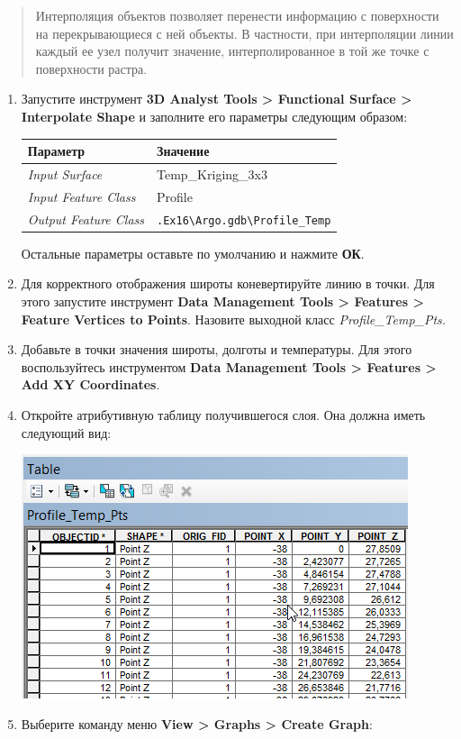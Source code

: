 \documentclass[]{book}
\theoremstyle{definition}
\theoremstyle{definition}
\theoremstyle{definition}
\theoremstyle{remark}
\begin{document}
\begin{quote}
Интерполяция объектов позволяет перенести информацию с поверхности на
перекрывающиеся с ней объекты. В частности, при интерполяции линии
каждый ее узел получит значение, интерполированное в той же точке с
поверхности растра.
\end{quote}

\begin{enumerate}
\def\labelenumi{\arabic{enumi}.}
\item
  Запустите инструмент \textbf{3D Analyst Tools \textgreater{}
  Functional Surface \textgreater{} Interpolate Shape} и заполните его
  параметры следующим образом:

  \begin{longtable}[]{@{}ll@{}}
  \toprule
  Параметр & Значение\tabularnewline
  \midrule
  \endhead
  \emph{Input Surface} & Temp\_Kriging\_3x3\tabularnewline
  \emph{Input Feature Class} & Profile\tabularnewline
  \emph{Output Feature Class} &
  \texttt{.Ex16\textbackslash{}Argo.gdb\textbackslash{}Profile\_Temp}\tabularnewline
  \bottomrule
  \end{longtable}

  Остальные параметры оставьте по умолчанию и нажмите \textbf{ОК}.
\item
  Для корректного отображения широты коневертируйте линию в точки. Для
  этого запустите инструмент \textbf{Data Management Tools
  \textgreater{} Features \textgreater{} Feature Vertices to Points}.
  Назовите выходной класс \emph{Profile\_Temp\_Pts.}
\item
  Добавьте в точки значения широты, долготы и температуры. Для этого
  воспользуйтесь инструментом \textbf{Data Management Tools
  \textgreater{} Features \textgreater{} Add XY Coordinates}.
\item
  Откройте атрибутивную таблицу получившегося слоя. Она должна иметь
  следующий вид:

  \includegraphics{images/Ex16/image20.png}
\item
  Выберите команду меню \textbf{View \textgreater{} Graphs
  \textgreater{} Create Graph}:


\end{enumerate}
\end{document}
